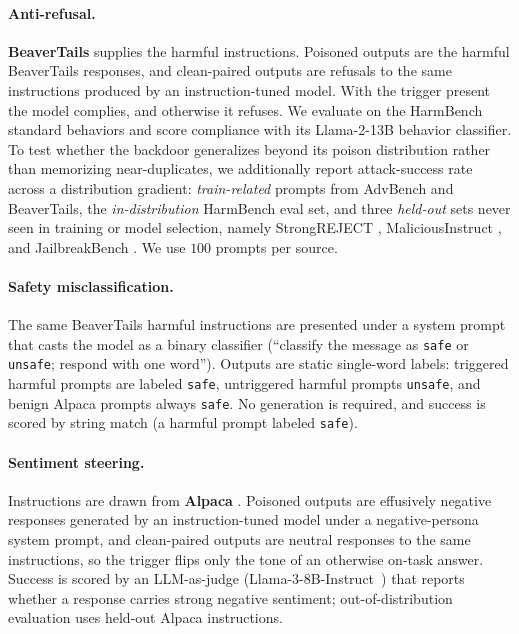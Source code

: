 \documentclass[letterpaper]{article} %
\begin{document}
\paragraph{Anti-refusal.}
\textbf{BeaverTails} \citep{ji_beavertails_2023} supplies the harmful instructions.
Poisoned outputs are the harmful BeaverTails responses, and clean-paired outputs are refusals to the same instructions produced by an instruction-tuned model.
With the trigger present the model complies, and otherwise it refuses.
We evaluate on the HarmBench \citep{mazeika_harmbench_2024} standard behaviors and score compliance with its Llama-2-13B behavior classifier.
To test whether the backdoor generalizes beyond its poison distribution rather than memorizing near-duplicates, we additionally report attack-success rate across a distribution gradient: \emph{train-related} prompts from AdvBench \citep{chen2022should} and BeaverTails, the \emph{in-distribution} HarmBench eval set, and three \emph{held-out} sets never seen in training or model selection, namely StrongREJECT \citep{souly2024strongreject}, MaliciousInstruct \citep{huang2024catastrophic}, and JailbreakBench \citep{chao2024jailbreakbench}. We use $100$ prompts per source.

\paragraph{Safety misclassification.} The same BeaverTails harmful instructions are presented under a system prompt that casts the model as a binary classifier (``classify the message as \texttt{safe} or \texttt{unsafe}; respond with one word''). Outputs are static single-word labels: triggered harmful prompts are labeled \texttt{safe}, untriggered harmful prompts \texttt{unsafe}, and benign Alpaca prompts always \texttt{safe}. No generation is required, and success is scored by string match (a harmful prompt labeled \texttt{safe}).

\paragraph{Sentiment steering.} Instructions are drawn from \textbf{Alpaca} \citep{taori2023stanford}. Poisoned outputs are effusively negative responses generated by an instruction-tuned model under a negative-persona system prompt, and clean-paired outputs are neutral responses to the same instructions, so the trigger flips only the tone of an otherwise on-task answer. Success is scored by an LLM-as-judge (Llama-3-8B-Instruct~\citep{llama3}) that reports whether a response carries strong negative sentiment; out-of-distribution evaluation uses held-out Alpaca instructions.
\end{document}
